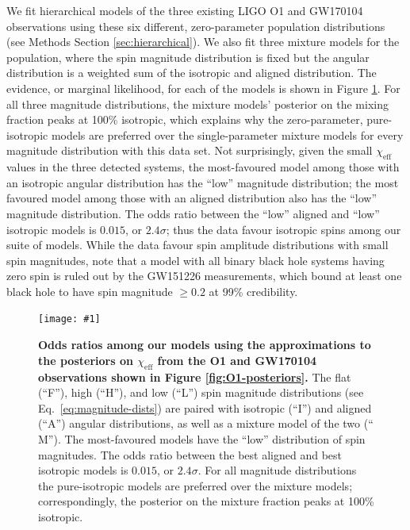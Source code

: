 \documentclass{nature}
\newcommand{\chieff}{\chi_\mathrm{eff}}
\newcommand{\OOneSigmaIsoAligned}{2.4}
\newcommand{\OOneOddsIsoAligned}{0.015}
\newcommand{\plotone}[1]{\texttt{[image: \#1]}}
\begin{document}
We fit hierarchical models of the three existing LIGO O1 and GW170104
observations using these six different, zero-parameter population
distributions (see Methods Section \ref{sec:hierarchical}).  We also
fit three mixture models for the population, where the spin magnitude
distribution is fixed but the angular distribution is a weighted sum
of the isotropic and aligned distribution.  The evidence, or marginal
likelihood, for each of the models is shown in Figure
\ref{fig:O1-odds}.  For all three magnitude distributions, the mixture
models' posterior on the mixing fraction peaks at 100\% isotropic,
which explains why the zero-parameter, pure-isotropic models are
preferred over the single-parameter mixture models for every magnitude
distribution with this data set.  Not surprisingly, given the small
$\chieff$ values in the three detected systems, the most-favoured
model among those with an isotropic angular distribution has the
``low'' magnitude distribution; the most favoured model among those
with an aligned distribution also has the ``low'' magnitude
distribution.  The odds ratio between the ``low'' aligned and ``low''
isotropic models is $\OOneOddsIsoAligned$, or
$\OOneSigmaIsoAligned\sigma$; thus the data favour isotropic spins
among our suite of models.  While the data favour spin amplitude
distributions with small spin magnitudes, note that a model with all
binary black hole systems having zero spin is ruled out by the
GW151226 measurements, which bound at least one black hole to have
spin magnitude $\geq 0.2$ at 99\%
credibility\cite{2016PhRvL.116x1103A}.

\begin{figure}
  \plotone{plots/Wills_evidence_ratio_figure_with_mixture_models}
  \caption{\textbf{Odds ratios among our models using the
      approximations to the posteriors on $\chieff$ from the O1 and GW170104
      observations shown in Figure \ref{fig:O1-posteriors}.}  The flat
    (``F''), high (``H''), and low (``L'') spin magnitude
    distributions (see Eq.\ \eqref{eq:magnitude-dists}) are paired
    with isotropic (``I'') and aligned (``A'') angular distributions,
    as well as a mixture model of the two (``$\mathrm{M}$'').  The
    most-favoured models have the ``low'' distribution of spin
    magnitudes.  The odds ratio between the best aligned and best
    isotropic models is $\OOneOddsIsoAligned$, or
    $\OOneSigmaIsoAligned\sigma$.  For all magnitude distributions the
    pure-isotropic models are preferred over the mixture models;
    correspondingly, the posterior on the mixture fraction peaks at
    100\% isotropic.}
  \label{fig:O1-odds}
\end{figure}
\end{document}
